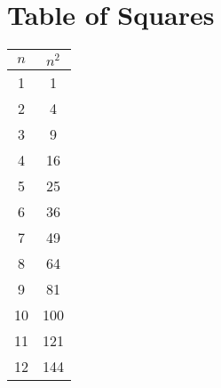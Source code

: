 \section{Table of Squares}

\begin{center}
    \begin{tabular}{cc}
        \toprule
        $n$ & $n^2$ \\
        \midrule
        1 & 1  \\
        2 & 4  \\
        3 & 9  \\
        4 & 16  \\
        5 & 25  \\
        6 & 36  \\
        7 & 49   \\
        8 & 64   \\
        9 & 81   \\
        10 & 100   \\
        11 & 121   \\
        12 & 144   \\
        \bottomrule
    \end{tabular}
\end{center}
